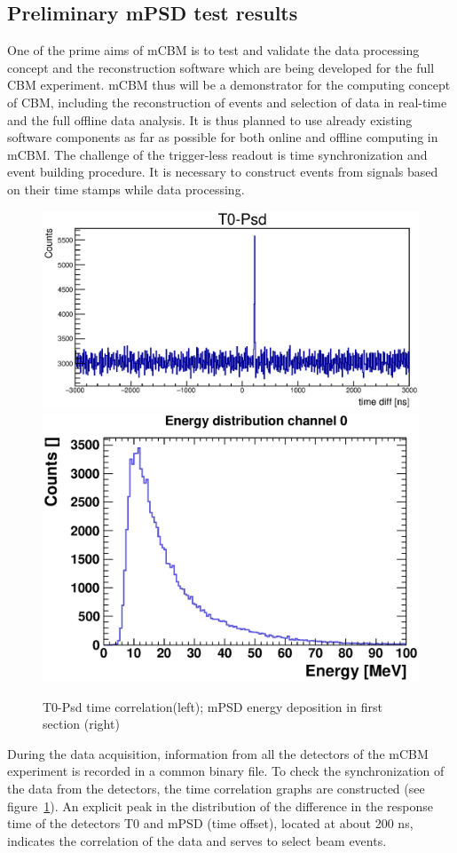 \documentclass[a4paper,11pt]{article}
\begin{document}
\subsection{Preliminary mPSD test results}
One of the prime aims of mCBM is to test and validate the data processing concept and the reconstruction software which are being developed for the full CBM experiment. mCBM thus will be a demonstrator for the computing concept of CBM, including the reconstruction of events and selection of data in real-time and the full offline data analysis. It is thus planned to use already existing software components as far as possible for both online and offline computing in mCBM.
The challenge of the trigger-less readout is time synchronization and event building procedure. It is necessary to construct events from signals based on their time stamps while data processing.

\begin{figure}[htbp]
\centering %
\includegraphics[width=.5\textwidth]{582_time_spectrum.eps}
\quad
\includegraphics[width=.35\textwidth]{en_distrib_ch0.eps}
\caption{\label{fig:6} T0-Psd time correlation(left);  mPSD energy deposition in first section (right)}
\end{figure}

During the data acquisition, information from all the detectors of the mCBM experiment is recorded in a common binary file. To check the synchronization of the data from the detectors, the time correlation graphs are constructed (see figure~\ref{fig:6}). An explicit peak in the distribution of the difference in the response time of the detectors T0 and mPSD (time offset), located at about 200 ns, indicates the correlation of the data and serves to select beam events.
\end{document}

